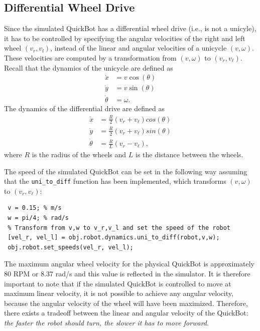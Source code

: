 \documentclass[10pt]{article}
\begin{document}
\subsection{Differential Wheel Drive}\label{diffdrive}
Since the simulated QuickBot has a differential wheel drive (i.e., is not a unicyle), it has to be controlled by specifying the angular velocities of the right and left wheel $(v_r,v_l)$, instead of the linear and angular velocities of a unicycle $(v,\omega)$. These velocities are computed by a transformation from $(v,\omega)$ to $(v_r,v_\ell)$. Recall that the dynamics of the unicycle are defined as
\begin{equation}
 \begin{split}
   \dot{x} &= v\cos(\theta) \\
   \dot{y} &= v\sin(\theta) \\
   \dot{\theta} &= \omega.
 \end{split}
\end{equation}
The dynamics of the differential drive are defined as
\begin{equation}
 \begin{split}
  \dot{x} &= \frac{R}{2}(v_r+v_\ell)cos(\theta) \\
  \dot{y} &= \frac{R}{2}(v_r+v_\ell)sin(\theta) \\
  \dot{\theta} &= \frac{R}{L}(v_r-v_\ell),
 \end{split}
\end{equation}
where $R$ is the radius of the wheels and $L$ is the distance between the wheels.

The speed of the simulated QuickBot can be set in the following way assuming that the \texttt{uni\_to\_diff} function has been implemented, which transforms $(v,\omega)$ to $(v_r,v_\ell)$:
\begin{verbatim}
 v = 0.15; % m/s
 w = pi/4; % rad/s
 % Transform from v,w to v_r,v_l and set the speed of the robot
 [vel_r, vel_l] = obj.robot.dynamics.uni_to_diff(robot,v,w);
 obj.robot.set_speeds(vel_r, vel_l);
\end{verbatim}

The maximum angular wheel velocity for the physical QuickBot is approximately 80 RPM or 8.37 rad/s and this value is reflected in the simulator. It is therefore important to note that if the simulated QuickBot is controlled to move at maximum linear velocity, it is not possible to achieve any angular velocity, because the angular velocity of the wheel will have been maximized. Therefore, there exists a tradeoff between the linear and angular velocity of the QuickBot: \textit{the faster the robot should turn, the slower it has to move forward}.
\end{document}

